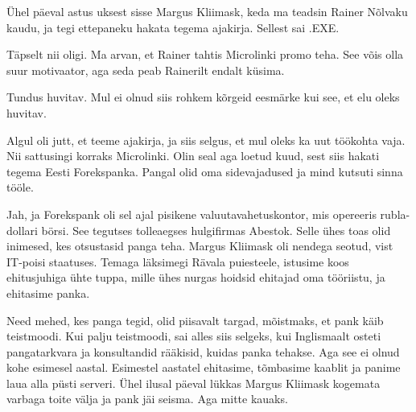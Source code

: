 
Ühel päeval astus uksest sisse Margus 
Kliimask, keda ma teadsin Rainer 
Nõlvaku kaudu, ja tegi ettepaneku hakata 
tegema ajakirja. Sellest sai .EXE.


Täpselt nii oligi. Ma arvan, et Rainer tahtis Microlinki promo teha. 
See võis olla suur motivaator, aga seda peab Rainerilt endalt küsima.


Tundus huvitav. Mul ei olnud siis rohkem kõrgeid eesmärke kui see, et elu oleks 
huvitav.


Algul oli jutt, et teeme ajakirja, ja siis selgus, 
et mul oleks ka uut töökohta vaja. Nii sattusingi korraks Microlinki. Olin seal aga loetud kuud, sest 
siis hakati tegema Eesti Forekspanka. Pangal olid oma sidevajadused ja mind kutsuti sinna tööle.


Jah, ja Forekspank oli sel ajal pisikene valuutavahetuskontor, mis opereeris 
rubla-dollari börsi.
See tegutses tolleaegses hulgifirmas Abestok. Selle ühes toas olid 
inimesed, kes otsustasid panga teha. Margus 
Kliimask oli nendega seotud, vist IT-poisi 
staatuses. Temaga läksimegi Rävala puiesteele, istusime koos 
ehitusjuhiga ühte tuppa, mille ühes nurgas hoidsid
ehitajad oma tööriistu, ja ehitasime panka.


Need mehed, kes panga tegid, olid piisavalt targad, mõistmaks, et pank käib 
teistmoodi. Kui palju teistmoodi, sai alles siis selgeks, kui 
Inglismaalt osteti pangatarkvara ja konsultandid rääkisid, kuidas panka 
tehakse. Aga see ei olnud kohe esimesel aastal. Esimestel aastatel ehitasime, 
tõmbasime kaablit ja panime laua alla püsti serveri. Ühel ilusal päeval lükkas
Margus Kliimask kogemata varbaga 
toite välja ja pank jäi seisma. Aga mitte kauaks. 


